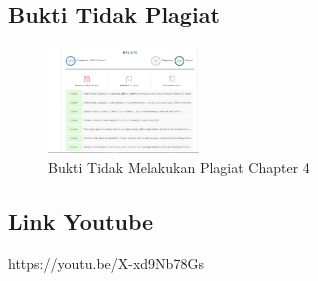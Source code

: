 \subsection{Bukti Tidak Plagiat}
\begin{figure}[H]
\centering
	\includegraphics[width=4cm]{figures/1174069/4/buktiplagiat/1.PNG}
	\caption{Bukti Tidak Melakukan Plagiat Chapter 4}
\end{figure}

\subsection{Link Youtube}
https://youtu.be/X-xd9Nb78Gs

